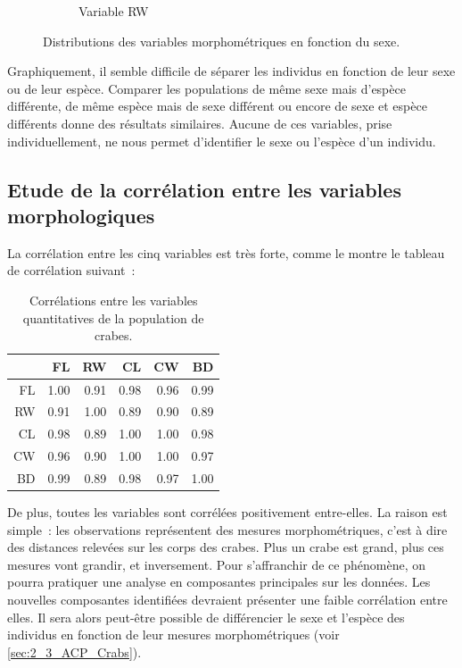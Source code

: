 \documentclass[a4paper,10pt]{report}
\begin{document}
\begin{figure}[H]
\begin{subfigure}[b]{0.3\linewidth}
		\caption{\scriptsize Variable RW}
		\label{fig:1_2_1_sex_rw}
	\end{subfigure}%
	\caption{
		\small Distributions des variables morphométriques en fonction du sexe.
	}
	\label{fig:morphemetriques_en_fonction_sexe}%
\end{figure}

Graphiquement, il semble difficile de séparer les individus en fonction de leur sexe ou de leur espèce. Comparer les populations de même sexe mais d'espèce différente, de même espèce mais de sexe différent ou encore de sexe et espèce différents donne des résultats similaires. Aucune de ces variables, prise individuellement, ne nous permet d'identifier le sexe ou l'espèce d'un individu.

\subsection{Etude de la corrélation entre les variables morphologiques}
\label{subsection:crabs_correlation_variables_quantitatives}

La corrélation entre les cinq variables est très forte, comme le montre le tableau de corrélation suivant~:
\begin{table}[h]
	\centering
	\captionsetup{justification=centering, margin=2cm}
	\caption{Corrélations entre les variables quantitatives de la population de crabes.}
	\begin{tabular}{r|rrrrr}
		& FL & RW & CL & CW & BD \\ 
		\hline
		FL & 1.00 & 0.91 & 0.98 & 0.96 & 0.99 \\ 
		RW & 0.91 & 1.00 & 0.89 & 0.90 & 0.89 \\ 
		CL & 0.98 & 0.89 & 1.00 & 1.00 & 0.98 \\ 
		CW & 0.96 & 0.90 & 1.00 & 1.00 & 0.97 \\ 
		BD & 0.99 & 0.89 & 0.98 & 0.97 & 1.00 \\ 
	\end{tabular}
\end{table}

De plus, toutes les variables sont corrélées positivement entre-elles. La raison est simple~: les observations représentent des mesures morphométriques, c'est à dire des distances relevées sur les corps des crabes. Plus un crabe est grand, plus ces mesures vont grandir, et inversement.
Pour s'affranchir de ce phénomène, on pourra pratiquer une analyse en composantes principales sur les données. Les nouvelles composantes identifiées devraient présenter une faible corrélation entre elles. Il sera alors peut-être possible de différencier le sexe et l'espèce des individus en fonction de leur mesures morphométriques (voir \autoref{sec:2_3_ACP_Crabs}).
\end{document}
